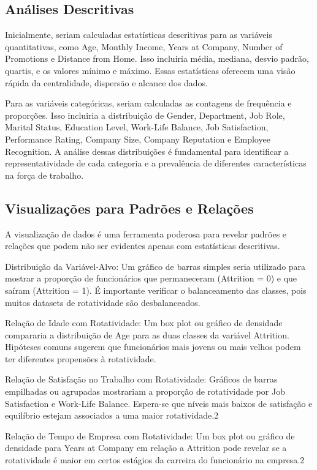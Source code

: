 \documentclass[sigconf]{acmart}
\begin{document}
\subsection{Análises Descritivas}
Inicialmente, seriam calculadas estatísticas descritivas para as variáveis quantitativas, como Age, Monthly Income, Years at Company, Number of Promotions e Distance from Home. Isso incluiria média, mediana, desvio padrão, quartis, e os valores mínimo e máximo. Essas estatísticas oferecem uma visão rápida da centralidade, dispersão e alcance dos dados.

Para as variáveis categóricas, seriam calculadas as contagens de frequência e proporções. Isso incluiria a distribuição de Gender, Department, Job Role, Marital Status, Education Level, Work-Life Balance, Job Satisfaction, Performance Rating, Company Size, Company Reputation e Employee Recognition. A análise dessas distribuições é fundamental para identificar a representatividade de cada categoria e a prevalência de diferentes características na força de trabalho.

\subsection{Visualizações para Padrões e Relações}
A visualização de dados é uma ferramenta poderosa para revelar padrões e relações que podem não ser evidentes apenas com estatísticas descritivas.

Distribuição da Variável-Alvo: Um gráfico de barras simples seria utilizado para mostrar a proporção de funcionários que permaneceram (Attrition = 0) e que saíram (Attrition = 1). É importante verificar o balanceamento das classes, pois muitos datasets de rotatividade são desbalanceados.

Relação de Idade com Rotatividade: Um box plot ou gráfico de densidade compararia a distribuição de Age para as duas classes da variável Attrition. Hipóteses comuns sugerem que funcionários mais jovens ou mais velhos podem ter diferentes propensões à rotatividade.

Relação de Satisfação no Trabalho com Rotatividade: Gráficos de barras empilhadas ou agrupadas mostrariam a proporção de rotatividade por Job Satisfaction e Work-Life Balance. Espera-se que níveis mais baixos de satisfação e equilíbrio estejam associados a uma maior rotatividade.2

Relação de Tempo de Empresa com Rotatividade: Um box plot ou gráfico de densidade para Years at Company em relação a Attrition pode revelar se a rotatividade é maior em certos estágios da carreira do funcionário na empresa.2
\end{document}
